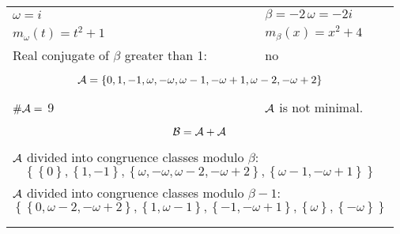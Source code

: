 \begin{exmp}
\label{ex:compareAG}


\rule{0cm}{0cm}

\begin{tabular}{ll}
$\omega=  i $  & $\beta= -2 \, \omega = -2 i $\\
$m_\omega(t)=  t^{2} + 1 $  & $m_\beta(x)=  x^{2} + 4 $\\
Real conjugate of $\beta$ greater than 1:   &  no \\ \hline
\multicolumn{2}{l}{\begin{minipage}{\textwidth}\begin{dmath*}\A = \left\{0, 1, -1, \omega, -\omega, \omega - 1, -\omega + 1, \omega - 2, -\omega + 2\right\}  \end{dmath*}\end{minipage} }\\
$\#\mathcal{A}= $ 9 $ $ & $\mathcal{A}$ is not minimal. \\
\multicolumn{2}{l}{\begin{minipage}{\textwidth}\begin{dmath*}\B =\A+\A \end{dmath*}\end{minipage} }\\[10pt]
\multicolumn{2}{l}{\begin{minipage}{\textwidth}$\mathcal{A}$ divided into congruence classes modulo $\beta$: \begin{dmath*} \left\{\left\{0\right\}, \left\{1, -1\right\}, \left\{\omega, -\omega, \omega - 2, -\omega + 2\right\}, \left\{\omega - 1, -\omega + 1\right\}\right\}  \end{dmath*}\end{minipage} }\\[10pt]
\multicolumn{2}{l}{\begin{minipage}{\textwidth}$\mathcal{A}$ divided into congruence classes modulo $\beta-1$: \begin{dmath*} \left\{\left\{0, \omega - 2, -\omega + 2\right\}, \left\{1, \omega - 1\right\}, \left\{-1, -\omega + 1\right\}, \left\{\omega\right\}, \left\{-\omega\right\}\right\}  \end{dmath*}\end{minipage} }\\
 & \\ \hline
 & \\
\end{tabular}


\end{exmp}
